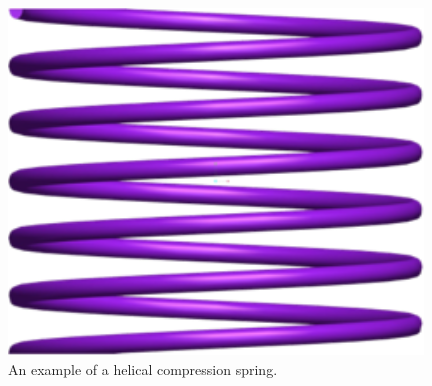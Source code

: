 \documentclass[10pt]{article}
\begin{document}
		\begin{figure}[h]
		 \begin{center}\includegraphics[scale=.2]{Spring.png}\end{center}
		 \caption{An example of a helical compression spring.}
		 \label{Spring}
		 
		 \end{figure}
\end{document}
